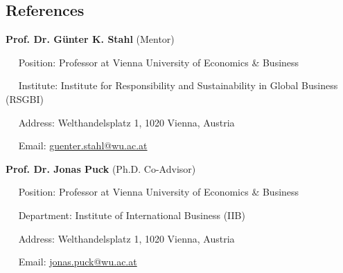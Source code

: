 \documentclass[11pt,a4paper]{article}
\begin{document}
\begin{cv}
\section{References}
  \begin{cvlist}{}
  \item[\textbf{Prof. Dr. Günter K. Stahl}] (Mentor)
  \item[~ ~{Position:}]  Professor at Vienna University of Economics \& Business 
  \item[~ ~{Institute:}]  Institute for Responsibility and Sustainability in Global Business (RSGBI)
  \item[~ ~{Address:}]   Welthandelsplatz 1, 1020 Vienna, Austria
  \item[~ ~{Email:}]     \href{mailto:guenter.stahl@wu.ac.at}{guenter.stahl@wu.ac.at}
  \item[\textbf{Prof. Dr. Jonas Puck}]  (Ph.D. Co-Advisor)
  \item[~ ~{Position:}]  Professor at Vienna University of Economics \& Business 
  \item[~ ~{Department:}] Institute of International Business (IIB)
  \item[~ ~{Address:}]   Welthandelsplatz 1, 1020 Vienna, Austria
  \item[~ ~{Email:}]     \href{mailto:jonas.puck@wu.ac.at}{jonas.puck@wu.ac.at}
  \end{cvlist}
\fi

\vfill
  \hfill{}
\end{cv}
\end{document}
